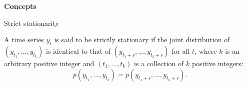 \documentclass[notes,blackandwhite,mathsans]{beamer}
\begin{document}
%
%
%











{
\begin{frame}

\begin{adjustwidth}{-0.5cm}{0cm}
\vspace{8.3cm}\Large
\textbf{{\color{mcxs1}Concepts} {\color{white}}}
\end{adjustwidth}

\end{frame}
}




\begin{frame}{Strict stationarity}

\vspace{0.3cm}
{\color{mcxs2}A time series }${y_t}$ {\color{mcxs2}is said to be} {\color{mcxs2}strictly stationary} {\color{mcxs2}if the joint distribution of} $(y_{t_1}, \dots , y_{t_k})$ {\color{mcxs2}is identical to that of} $(y_{t_1+s}, \dots , y_{t_k+s})$ {\color{mcxs2}for all $t$, where $k$ is an arbitrary positive integer and} $(t_1, \dots , t_k)$ {\color{mcxs2}is a collection of $k$ positive integers:}
$$ p(y_{t_1}, \dots , y_{t_k}) = p(y_{t_1+s}, \dots , y_{t_k+s}). $$

\end{frame}
\end{document}
